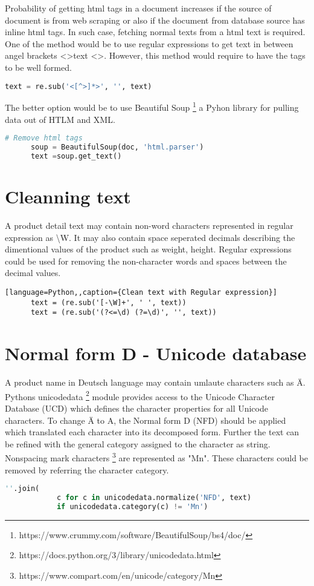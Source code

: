 Probability of getting html tags in a document increases if the source of document is from web scraping or also if the document from database source has inline html tags. In such case, fetching normal texts from a html text is required. One of the method would be to use regular expressions to get text in between angel brackets \textless \textgreater text \textless \textgreater. However, this method would require to have the tags to be well formed.
\begin{lstlisting}[language=Python, caption={Regular expression to get text from html}]
      text = re.sub('<[^>]*>', '', text)
\end{lstlisting}



The better option would be to use Beautiful Soup \footnote{https://www.crummy.com/software/BeautifulSoup/bs4/doc/} a Pyhon library for pulling data out of HTLM and XML.
\begin{lstlisting}[language=Python, caption={Beautiful soap API to get text from html}]
      # Remove html tags 
      soup = BeautifulSoup(doc, 'html.parser')
      text =soup.get_text()
\end{lstlisting}

\section{Cleanning text}
A product detail text may contain non-word characters represented in regular expression as \textbackslash W. It may also contain space seperated decimals describing the dimentional values of the product such as weight, height. Regular expressions could be used for removing the non-character words and spaces between the decimal values. 

\begin{lstlisting}[language=Python,,caption={Clean text with Regular expression}]
      text = (re.sub('[-\W]+', ' ', text))
      text = (re.sub('(?<=\d) (?=\d)', '', text))
\end{lstlisting}

\section{Normal form D - Unicode database}

A product name in Deutsch language may contain umlaute characters such as \"A.  Pythons unicodedata \footnote{https://docs.python.org/3/library/unicodedata.html} module provides access to the Unicode Character Database (UCD) which defines the character properties for all Unicode characters. To change \"A to A, the Normal form D (NFD) should be applied which translated each character into its decomposed form. Further the text can be refined with the general category assigned to the character as string. Nonspacing mark characters \footnote{https://www.compart.com/en/unicode/category/Mn} are represented as "Mn". These characters could be removed by referring the character category.
\begin{lstlisting}[language=Python ,caption={NFD normalization}]
      ''.join(
            c for c in unicodedata.normalize('NFD', text)
            if unicodedata.category(c) != 'Mn')
\end{lstlisting}

